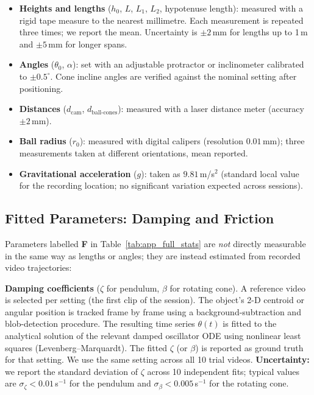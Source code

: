 \documentclass[runningheads]{llncs}
\begin{document}
\begin{itemize}[noitemsep]
  \item \textbf{Heights and lengths} ($h_0$, $L$, $L_1$, $L_2$,
    hypotenuse length): measured with a rigid tape measure to the nearest
    millimetre. Each measurement is repeated three times; we report the
    mean. Uncertainty is $\pm 2$\,mm for lengths up to 1\,m and $\pm 5$\,mm
    for longer spans.

  \item \textbf{Angles} ($\theta_0$, $\alpha$): set with an adjustable
    protractor or inclinometer calibrated to $\pm 0.5^\circ$. Cone incline
    angles are verified against the nominal setting after positioning.

  \item \textbf{Distances} ($d_{\mathrm{cam}}$, $d_{\mathrm{ball\text{-}cones}}$):
    measured with a laser distance meter (accuracy $\pm 2$\,mm).

  \item \textbf{Ball radius} ($r_0$): measured with digital calipers
    (resolution $0.01$\,mm); three measurements taken at different
    orientations, mean reported.

  \item \textbf{Gravitational acceleration} ($g$): taken as $9.81$\,m/s$^2$
    (standard local value for the recording location; no significant
    variation expected across sessions).
\end{itemize}

\subsection{Fitted Parameters: Damping and Friction}
\label{app:fitted_params}

Parameters labelled \textbf{F} in Table~\ref{tab:app_full_stats} are
\emph{not} directly measurable in the same way as lengths or angles;
they are instead estimated from recorded video trajectories:

\textbf{Damping coefficients} ($\zeta$ for pendulum, $\beta$ for rotating
cone). A reference video is selected per setting (the first clip of the
session). The object's 2-D centroid or angular position is tracked frame by
frame using a background-subtraction and blob-detection procedure.
The resulting time series $\theta(t)$ is fitted to the analytical solution
of the relevant damped oscillator ODE using nonlinear least squares
(Levenberg–Marquardt). The fitted $\zeta$ (or $\beta$) is reported as
ground truth for that setting. We use the same setting across all 10 trial
videos. \textbf{Uncertainty:} we report the standard deviation of $\zeta$
across 10 independent fits; typical values are $\sigma_\zeta < 0.01$\,s$^{-1}$
for the pendulum and $\sigma_\beta < 0.005$\,s$^{-1}$ for the rotating cone.
\end{document}
